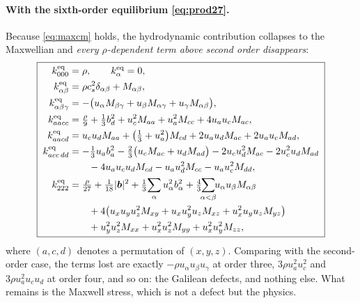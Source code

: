 \documentclass[11pt,a4paper]{article}
\newcommand{\cs}{c_s}
\newcommand{\bb}{\bm{b}}
\begin{document}
\paragraph{With the sixth-order equilibrium \eqref{eq:prod27}.} Because
\eqref{eq:maxcm} holds, the hydrodynamic contribution collapses to the Maxwellian
and \emph{every $\rho$-dependent term above second order disappears}:
\begin{equation}
  \boxed{\;
  \begin{aligned}
    k_{000}^{\rm eq} &= \rho, \qquad k_{\alpha}^{\rm eq} = 0, \\
    k_{\alpha\beta}^{\rm eq} &= \rho\cs^2\delta_{\alpha\beta} + M_{\alpha\beta}, \\
    k_{\alpha\beta\gamma}^{\rm eq} &= -\big(u_\alpha M_{\beta\gamma}
      + u_\beta M_{\alpha\gamma} + u_\gamma M_{\alpha\beta}\big), \\
    k_{aacc}^{\rm eq} &= \tfrac{\rho}{9} + \tfrac13 b_d^2
      + u_c^2 M_{aa} + u_a^2 M_{cc} + 4u_au_c M_{ac}, \\
    k_{aacd}^{\rm eq} &= u_cu_d M_{aa}
      + \big(\tfrac13 + u_a^2\big) M_{cd}
      + 2u_au_d M_{ac} + 2u_au_c M_{ad}, \\
    k_{acc\,dd}^{\rm eq} &= -\tfrac13 u_a b_a^2
      - \tfrac23\big(u_c M_{ac} + u_d M_{ad}\big)
      - 2u_cu_d^2 M_{ac} - 2u_c^2u_d M_{ad} \\
      &\qquad - 4u_au_cu_d M_{cd} - u_au_d^2 M_{cc} - u_au_c^2 M_{dd}, \\
    k_{222}^{\rm eq} &= \tfrac{\rho}{27} + \tfrac{1}{18}|\bb|^2
      + \tfrac13\!\sum_\alpha u_\alpha^2 b_\alpha^2
      + \tfrac43\!\!\sum_{\alpha<\beta}\!\! u_\alpha u_\beta M_{\alpha\beta} \\
      &\qquad + 4\big(u_xu_yu_z^2 M_{xy} + u_xu_y^2u_z M_{xz}
                    + u_x^2u_yu_z M_{yz}\big) \\
      &\qquad + u_y^2u_z^2 M_{xx} + u_x^2u_z^2 M_{yy} + u_x^2u_y^2 M_{zz},
  \end{aligned}\;}
  \label{eq:cm3dho}
\end{equation}
where $(a,c,d)$ denotes a permutation of $(x,y,z)$. Comparing with the
second-order case, the terms lost are exactly
$-\rho u_\alpha u_\beta u_\gamma$ at order three, $3\rho u_a^2u_c^2$ and
$3\rho u_a^2u_cu_d$ at order four, and so on: the Galilean defects, and nothing
else. What remains is the Maxwell stress, which is not a defect but the physics.
\end{document}

